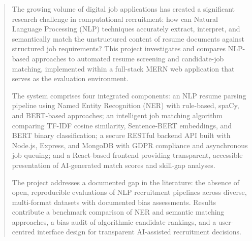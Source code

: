 \documentclass[12pt,a4paper]{report}
\begin{document}
\begin{abstract}
The growing volume of digital job applications has created a significant research challenge in computational recruitment: how can Natural Language Processing (NLP) techniques accurately extract, interpret, and semantically match the unstructured content of resume documents against structured job requirements? This project investigates and compares NLP-based approaches to automated resume screening and candidate-job matching, implemented within a full-stack MERN web application that serves as the evaluation environment.

The system comprises four integrated components: an NLP resume parsing pipeline using Named Entity Recognition (NER) with rule-based, spaCy, and BERT-based approaches; an intelligent job matching algorithm comparing TF-IDF cosine similarity, Sentence-BERT embeddings, and BERT binary classification; a secure RESTful backend API built with Node.js, Express, and MongoDB with GDPR compliance and asynchronous job queuing; and a React-based frontend providing transparent, accessible presentation of AI-generated match scores and skill-gap analyses.

The project addresses a documented gap in the literature: the absence of open, reproducible evaluations of NLP recruitment pipelines across diverse, multi-format datasets with documented bias assessments. Results contribute a benchmark comparison of NER and semantic matching approaches, a bias audit of algorithmic candidate rankings, and a user-centred interface design for transparent AI-assisted recruitment decisions.
\end{abstract}

\tableofcontents
\listoffigures
\listoftables







\appendix




\end{document}
